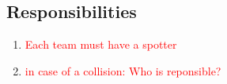 \subsection{Responsibilities}
\begin{enumerate}
	\item{\textcolor{red}{Each team must have a spotter}}
	\item{\textcolor{red}{in case of a collision: Who is reponsible? }}

\end{enumerate}
